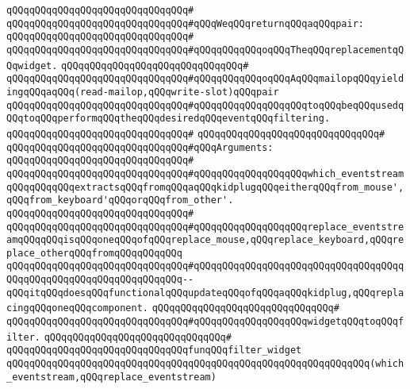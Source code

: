 \verb|qQQqqQQqqQQqqQQqqQQqqQQqqQQqqQQq#|\newline
\verb|qQQqqQQqqQQqqQQqqQQqqQQqqQQqqQQq#qQQqWeqQQqreturnqQQqaqQQqpair:|\newline
\verb|qQQqqQQqqQQqqQQqqQQqqQQqqQQqqQQq#|\newline
\verb|qQQqqQQqqQQqqQQqqQQqqQQqqQQqqQQq#qQQqqQQqqQQqoqQQqTheqQQqreplacementqQQqwidget.|\newline
\verb|qQQqqQQqqQQqqQQqqQQqqQQqqQQqqQQq#|\newline
\verb|qQQqqQQqqQQqqQQqqQQqqQQqqQQqqQQq#qQQqqQQqqQQqoqQQqAqQQqmailopqQQqyieldingqQQqaqQQq(read-mailop,qQQqwrite-slot)qQQqpair|\newline
\verb|qQQqqQQqqQQqqQQqqQQqqQQqqQQqqQQq#qQQqqQQqqQQqqQQqqQQqtoqQQqbeqQQqusedqQQqtoqQQqperformqQQqtheqQQqdesiredqQQqeventqQQqfiltering.|\newline
\verb|qQQqqQQqqQQqqQQqqQQqqQQqqQQqqQQq#|\newline
\verb|qQQqqQQqqQQqqQQqqQQqqQQqqQQqqQQq#|\newline
\verb|qQQqqQQqqQQqqQQqqQQqqQQqqQQqqQQq#qQQqArguments:|\newline
\verb|qQQqqQQqqQQqqQQqqQQqqQQqqQQqqQQq#|\newline
\verb|qQQqqQQqqQQqqQQqqQQqqQQqqQQqqQQq#qQQqqQQqqQQqqQQqqQQqwhich_eventstreamqQQqqQQqqQQqextractsqQQqfromqQQqaqQQqkidplugqQQqeitherqQQqfrom_mouse',qQQqfrom_keyboard'qQQqorqQQqfrom_other'.|\newline
\verb|qQQqqQQqqQQqqQQqqQQqqQQqqQQqqQQq#|\newline
\verb|qQQqqQQqqQQqqQQqqQQqqQQqqQQqqQQq#qQQqqQQqqQQqqQQqqQQqreplace_eventstreamqQQqqQQqisqQQqoneqQQqofqQQqreplace_mouse,qQQqreplace_keyboard,qQQqreplace_otherqQQqfromqQQqqQQqqQQq|\newline
\verb|qQQqqQQqqQQqqQQqqQQqqQQqqQQqqQQq#qQQqqQQqqQQqqQQqqQQqqQQqqQQqqQQqqQQqqQQqqQQqqQQqqQQqqQQqqQQqqQQqqQQq--qQQqitqQQqdoesqQQqfunctionalqQQqupdateqQQqofqQQqaqQQqkidplug,qQQqreplacingqQQqoneqQQqcomponent.|\newline
\verb|qQQqqQQqqQQqqQQqqQQqqQQqqQQqqQQq#|\newline
\verb|qQQqqQQqqQQqqQQqqQQqqQQqqQQqqQQq#qQQqqQQqqQQqqQQqqQQqwidgetqQQqtoqQQqfilter.|\newline
\verb|qQQqqQQqqQQqqQQqqQQqqQQqqQQqqQQq#|\newline
\verb|qQQqqQQqqQQqqQQqqQQqqQQqqQQqqQQqfunqQQqfilter_widget|\newline
\verb|qQQqqQQqqQQqqQQqqQQqqQQqqQQqqQQqqQQqqQQqqQQqqQQqqQQqqQQqqQQqqQQq(which_eventstream,qQQqreplace_eventstream)|\newline

